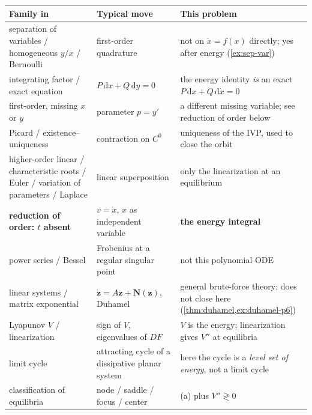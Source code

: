 \documentclass[11pt,a4paper]{article}
\begin{document}
{\footnotesize
\begin{center}
\begin{tabular}{@{}>{\raggedright\arraybackslash}p{3.5cm}
                   >{\raggedright\arraybackslash}p{5.3cm}
                   >{\raggedright\arraybackslash}p{5.0cm}@{}}
\toprule
Family in \cite{grade2ode} & Typical move & This problem \\
\midrule
separation of variables / homogeneous \(y/x\) / Bernoulli & first-order quadrature & not on \(\ddot x=f(x)\) directly; yes after energy (\cref{ex:sep-var}) \\
integrating factor / exact equation & \(P\,\mathrm{d}x+Q\,\mathrm{d}y=0\) & the energy identity \emph{is} an exact \(P\,\mathrm{d}x+Q\,\mathrm{d}\dot x=0\) \\
first-order, missing \(x\) or \(y\) & parameter \(p=y'\) & a different missing variable; see reduction of order below \\
Picard / existence--uniqueness & contraction on \(C^{0}\) & uniqueness of the IVP, used to close the orbit \\
higher-order linear / characteristic roots / Euler / variation of parameters / Laplace & linear superposition & only the linearization at an equilibrium \\
\textbf{reduction of order: \(t\) absent} & \(v=\dot x\), \(x\) as independent variable & \textbf{the energy integral} \\
power series / Bessel & Frobenius at a regular singular point & not this polynomial ODE \\
linear systems / matrix exponential & \(\dot{\mathbf{z}}=A\mathbf{z}+\mathbf{N}(\mathbf{z})\), Duhamel & general brute-force theory; does not close here (\cref{thm:duhamel,ex:duhamel-p6}) \\
Lyapunov \(V\) / linearization & sign of \(V\), eigenvalues of \(DF\) & \(V\) is the energy; linearization gives \(V''\) at equilibria \\
limit cycle & attracting cycle of a dissipative planar system & here the cycle is a \emph{level set of energy}, not a limit cycle \\
classification of equilibria & node / saddle / focus / center & (a) plus \(V''\gtrless 0\) \\
\bottomrule
\end{tabular}
\end{center}
}
\end{document}
